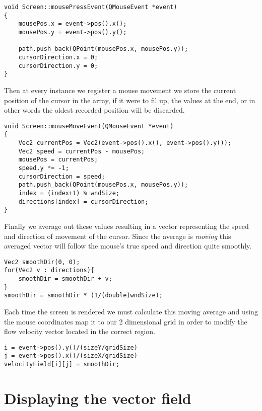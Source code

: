 \documentclass[12pt, titlepage]{article}
\begin{document}
\bigskip

\begin{lstlisting}
void Screen::mousePressEvent(QMouseEvent *event)
{
    mousePos.x = event->pos().x();
    mousePos.y = event->pos().y();

    path.push_back(QPoint(mousePos.x, mousePos.y));
    cursorDirection.x = 0;
    cursorDirection.y = 0;
}
\end{lstlisting}

\bigskip

Then at every instance we register a mouse movement we store the current position of the cursor in the array, if it were to fil up, the values at the end, or in other words the oldest recorded position will be discarded.

\begin{lstlisting}
void Screen::mouseMoveEvent(QMouseEvent *event)
{
    Vec2 currentPos = Vec2(event->pos().x(), event->pos().y());
    Vec2 speed = currentPos - mousePos;
    mousePos = currentPos;
    speed.y *= -1;
    cursorDirection = speed;
    path.push_back(QPoint(mousePos.x, mousePos.y));
    index = (index+1) % wndSize;
    directions[index] = cursorDirection;
}
\end{lstlisting}

\bigskip

Finally we average out these values resulting in a vector representing the speed and direction of movement of the cursor. Since the average is \textit{moving} this averaged vector will follow the mouse's true speed and direction quite smoothly.

\begin{lstlisting}
Vec2 smoothDir(0, 0);
for(Vec2 v : directions){
    smoothDir = smoothDir + v;
}
smoothDir = smoothDir * (1/(double)wndSize);
\end{lstlisting}

\bigskip

Each time the screen is rendered we must calculate this moving average and using the mouse coordinates map it to our 2 dimensional grid in order to modify the flow velocity vector located in the correct region.

\begin{lstlisting}
i = event->pos().y()/(sizeY/gridSize)
j = event->pos().x()/(sizeX/gridSize)
velocityField[i][j] = smoothDir;
\end{lstlisting}

\section{Displaying the vector field}
\end{document}
